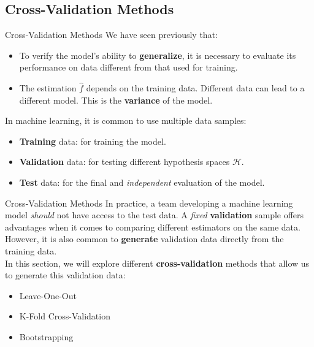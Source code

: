 \subsection[Cross-Validation Methods]{Cross-Validation Methods}

\begin{frame}{Cross-Validation Methods}
	We have seen previously that:
	\begin{itemize}
		\item To verify the model's ability to \textbf{generalize}, it is necessary to evaluate its performance on data different from that used for training.
		\item The estimation $\hat{f}$ depends on the training data. Different data can lead to a different model. This is the \textbf{variance} of the model.
	\end{itemize}
	\pause
	\vspace{0.5cm}
	In machine learning, it is common to use multiple data samples:
	\begin{itemize}
		\item \textbf{Training} data: for training the model.
		\item \textbf{Validation} data: for testing different hypothesis spaces $\mathcal{H}$.
		\item \textbf{Test} data: for the final and \textit{independent} evaluation of the model.
	\end{itemize}
\end{frame}

\begin{frame}{Cross-Validation Methods}
	In practice, a team developing a machine learning model \textit{should} not have access to the test data. A \textit{fixed} \textbf{validation} sample offers advantages when it comes to comparing different estimators on the same data. However, it is also common to \textbf{generate} validation data directly from the training data. \\
	\pause
	\vspace{0.5cm}
	In this section, we will explore different \textbf{cross-validation} methods that allow us to generate this validation data:
	\begin{itemize}
		\item Leave-One-Out
		\item K-Fold Cross-Validation
		\item Bootstrapping
	\end{itemize}
\end{frame}


